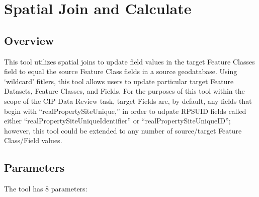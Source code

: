 \documentclass[openany]{book}
\theoremstyle{definition}
\theoremstyle{definition}
\theoremstyle{definition}
\theoremstyle{remark}
\begin{document}
\hypertarget{spatjoinCalc}{\chapter{Spatial Join and
Calculate}\label{spatjoinCalc}}

\section{Overview}\label{overview-2}

This tool utilizes spatial joins to update field values in the target
Feature Classes field to equal the source Feature Class fields in a
source geodatabase. Using `wildcard' fitlers, this tool allows users to
update particular target Feature Datasets, Feature Classes, and Fields.
For the purposes of this tool within the scope of the CIP Data Review
task, target Fields are, by default, any fields that begin with
``realPropertySiteUnique,'' in order to udpate RPSUID fields called
either ``realPropertySiteUniqueIdentifier'' or
``realPropertySiteUniqueID''; however, this tool could be extended to
any number of source/target Feature Class/Field values.

\section{Parameters}\label{parameters-2}

The tool has 8 parameters:
\end{document}
